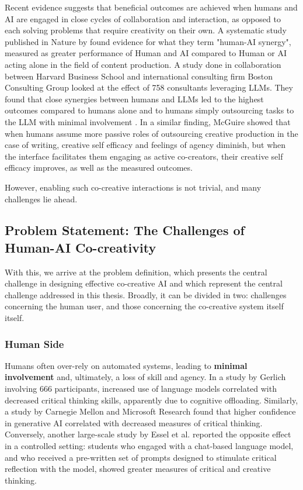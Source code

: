 Recent evidence suggests that beneficial outcomes are achieved when humans and AI are engaged in close cycles of collaboration and interaction, as opposed to each solving problems that require creativity on their own. A systematic study published in Nature by \cite{Vaccaro2024-ne} found evidence for what they term "human-AI synergy", measured as greater performance of Human and AI compared to Human or AI acting alone in the field of content production. A study done in collaboration between Harvard Business School and international consulting firm Boston Consulting Group looked at the effect of 758 consultants leveraging LLMs. They found that close synergies between humans and LLMs led to the highest outcomes compared to humans alone and to humans simply outsourcing tasks to the LLM with minimal involvement \cite{DellAcqua2023-og}. In a similar finding, McGuire \cite{McGuire2024-im} showed that when humans assume more passive roles of outsourcing creative production in  the case of writing, creative self efficacy and feelings of agency diminish, but when the interface facilitates them engaging as active co-creators, their creative self efficacy improves, as well as the measured outcomes. 

However, enabling such co-creative interactions is not trivial, and many challenges lie ahead. 

\subsection{Problem Statement: The Challenges of Human-AI Co-creativity}

With this, we arrive at the problem definition, which presents the central challenge in designing effective co-creative AI and which represent the central challenge addressed in this thesis. Broadly, it can be divided in two: challenges concerning the human user, and those concerning the co-creative system itself itself.

\subsubsection{Human Side}

Humans often over-rely on automated systems, leading to \textbf{minimal involvement} and, ultimately, a loss of skill and agency. In a study by Gerlich \cite{Gerlich2025-as} involving 666 participants, increased use of language models correlated with decreased critical thinking skills, apparently due to cognitive offloading. Similarly, a study by Carnegie Mellon and Microsoft Research found \cite{Lee2025-dw} that higher confidence in generative AI correlated with decreased measures of critical thinking. Conversely, another large-scale study by Essel et al. \cite{Essel2024-qc} reported the opposite effect in a controlled setting: students who engaged with a chat-based language model, and who received a pre-written set of prompts designed to stimulate critical reflection with the model, showed greater measures of critical and creative thinking.


